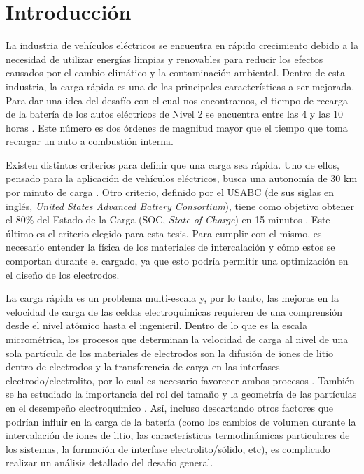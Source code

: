 \section{Introducción}

La industria de vehículos eléctricos se encuentra en rápido crecimiento debido a la
necesidad de utilizar energías limpias y renovables para reducir los efectos 
causados por el cambio climático y la contaminación ambiental. Dentro de esta 
industria, la carga rápida es una de las principales características a ser 
mejorada. Para dar una idea del desafío con el cual nos encontramos, el tiempo 
de recarga de la batería de los autos eléctricos de Nivel 2 se encuentra entre 
las 4 y las 10 horas \cite{evcs}. Este número es dos órdenes de magnitud 
mayor que el tiempo que toma recargar un auto a combustión interna.

Existen distintos criterios para definir que una carga sea rápida. Uno de ellos, 
pensado para la aplicación de vehículos eléctricos, busca una autonomía de 30 km 
por minuto de carga \cite{dufek2022}. Otro criterio, definido por el USABC (de sus
siglas en inglés, \textit{United States Advanced Battery Consortium}), tiene como
objetivo obtener el 80\% del Estado de la Carga (SOC, \textit{State-of-Charge})
en 15 minutos \cite{USABC}. Este último es el criterio elegido para esta tesis.
Para cumplir con el mismo, es necesario entender la física de los materiales de
intercalación y cómo estos se comportan durante el cargado, ya que esto podría 
permitir una optimización en el diseño de los electrodos.

La carga rápida es un problema multi-escala \cite{franco2013, franco2019} y, por 
lo tanto, las mejoras en la velocidad de carga de las celdas electroquímicas 
requieren de una comprensión desde el nivel atómico hasta el ingenieril. Dentro 
de lo que es la escala micrométrica, los procesos que determinan la velocidad de 
carga al nivel de una sola partícula de los materiales de electrodos son la 
difusión de iones de litio dentro de electrodos y la transferencia de carga en 
las interfases electrodo/electrolito, por lo cual es necesario favorecer ambos
procesos \cite{liu2019, tomaszewska2019, weiss2021}. También se ha estudiado la 
importancia del rol del tamaño y la geometría de las partículas en el desempeño 
electroquímico \cite{gavilan2020, gavilan2022}. Así, incluso descartando
otros factores que podrían influir en la carga de la batería (como los cambios de 
volumen durante la intercalación de iones de litio, las características termodinámicas particulares
de los sistemas, la formación de interfase electrolito/sólido, etc), es complicado
realizar un análisis detallado del desafío general.

